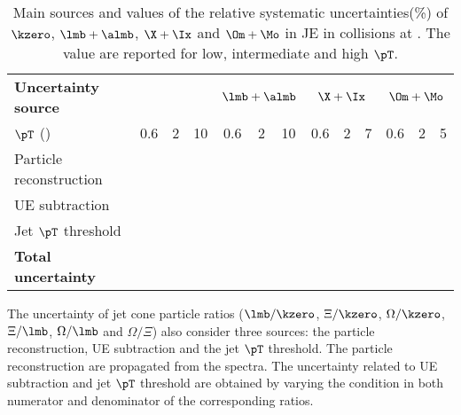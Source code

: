 \begin{table}[!ht]
	\begin{center}
		\caption{Main sources and values of the relative systematic uncertainties(\%) of $\kzero$,  $\lmb + \almb$, $\X + \Ix$ and $\Om + \Mo$ in JE in \pPb collisions at \fivenn.
			The value are reported for low, intermediate and high $\pT$.}
		\label{tab:pPbJEUncer}
		\begin{tabularx}{\textwidth}{@{} lCCCCCCCCCCCC @{}}
			\toprule
			\textbf{Uncertainty source} & 
			& 
			& 
			&  \\
			\cmidrule(lr){2-4}  \cmidrule(lr){5-7} \cmidrule(lr){8-10} \cmidrule(lr){11-13}
			$\pT$ (\GeVc) & 0.6 & 2 &10   & 0.6 & 2 & 10     & 0.6 & 2 & 7    & 0.6& 2 & 5 \\
			\midrule
			Particle reconstruction\\
			UE subtraction\\
			Jet $\pT$ threshold\\
			\midrule
			\textbf{Total uncertainty} \\
			\bottomrule
		\end{tabularx}
	\end{center}
\end{table}

The uncertainty of jet cone particle ratios ($\lmb/\kzero$, $\Xi/\kzero$, $\Omega/\kzero$, $\Xi/\lmb$, $\Omega/\lmb$ and $\Omega/\Xi$) also consider three sources: the particle reconstruction, UE subtraction and the jet $\pT$ threshold. The particle reconstruction are propagated from the spectra. The uncertainty related to UE subtraction and jet $\pT$ threshold are obtained by varying the condition in both numerator and denominator of the corresponding ratios. 

